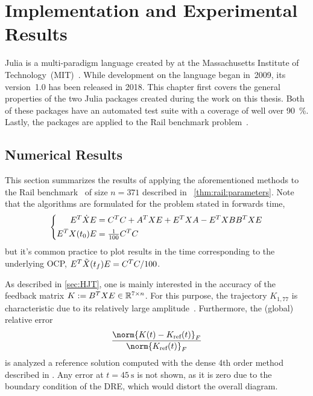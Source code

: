 \chapter{Implementation and Experimental Results}
\label{sec:impl}

Julia is a multi-paradigm language created by \citeauthor{Julia} at the Massachusetts Institute of Technology~(MIT)~\cite{Julia}.
While development on the language began in~2009, its version~1.0 has been released in 2018.
This chapter first covers the general properties of the two Julia packages created during the work on this thesis.
Both of these packages have an automated test suite with a coverage of well over \SI{90}{\percent}.
Lastly, the packages are applied to the Rail benchmark problem~\cite{morwiki_steel}.




\section{Numerical Results}

This section summarizes the results of applying the aforementioned methods to
the Rail benchmark~\cite{morwiki_steel} of size $n=371$
described in \eg~\autoref{thm:rail:parameters}.
Note that the algorithms are formulated for the problem stated in forwards time,
\begin{equation}
\left\{
\begin{aligned}
  E^T \dot X E &= C^T C + A^T X E + E^T X A - E^T X BB^T X E \\
  E^T X(t_0) E &= \tfrac{1}{100} C^T C
\end{aligned}
\right.
\end{equation}
but it's common practice to plot results in the time corresponding to the underlying \ac{OCP},
\ie $E^T \tilde X(t_f) E = C^T C/100$.

As described in \autoref{sec:HJT},
one is mainly interested in the accuracy of the feedback matrix
$
  K := B^T X E \in \mathbb{R}^{7 \times n}
$.
For this purpose, the trajectory $K_{1,77}$ is characteristic due to its relatively large amplitude~\cite{Lang2015}.
Furthermore, the (global) relative error
\begin{equation}
\label{eq:results:err:ref}
  \frac{\norm{K(t) - K_\text{ref}(t)}_F}{\norm{K_\text{ref}(t)}_F}
\end{equation}
is analyzed \wrt a reference solution computed with the dense 4th order method described in \cite[Appendix~A]{Lang2017}.
Any error at $t=\SI{45}{\second}$ is not shown,
as it is zero due to the boundary condition of the \ac{DRE},
which would distort the overall diagram.

